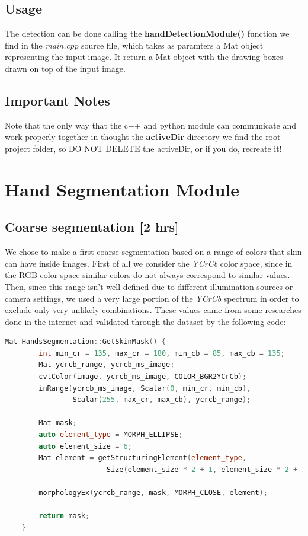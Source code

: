 \subsection{Usage}
The detection can be done calling the \textbf{handDetectionModule()} function we find in the \textit{main.cpp} source file, which takes as paramters a Mat object representing 
the input image. It return a Mat object with the drawing boxes drawn on top of the input image. 

\subsection{Important Notes}
Note that the only way that the c++ and python module can communicate and work properly together in thought the \textbf{activeDir} directory we find 
the root project folder, so DO NOT DELETE the activeDir, or if you do, recreate it! 

\section{Hand Segmentation Module}

\subsection{Coarse segmentation [2 hrs]}
We chose to make a first coarse segmentation based on a range of colors that
skin can have inside images. First of all we consider the \textit{YCrCb} color
space, since in the RGB color space similar colors do not always correspond to
similar values. Then, since this range isn't well defined due to
different illumination sources or camera settings, we used a very large portion
of the \textit{YCrCb} spectrum in order to exclude only very unlikely
combinations. These values came from some researches done in the internet and
validated through the dataset by the following code:

\begin{lstlisting}[language = c++]
    Mat HandsSegmentation::GetSkinMask() {
        int min_cr = 135, max_cr = 180, min_cb = 85, max_cb = 135;
        Mat ycrcb_range, ycrcb_ms_image;
        cvtColor(image, ycrcb_ms_image, COLOR_BGR2YCrCb);
        inRange(ycrcb_ms_image, Scalar(0, min_cr, min_cb), 
                Scalar(255, max_cr, max_cb), ycrcb_range);
    
        Mat mask;
        auto element_type = MORPH_ELLIPSE;
        auto element_size = 6;
        Mat element = getStructuringElement(element_type, 
                        Size(element_size * 2 + 1, element_size * 2 + 1));

        morphologyEx(ycrcb_range, mask, MORPH_CLOSE, element);
    
        return mask;
    }
\end{lstlisting}

